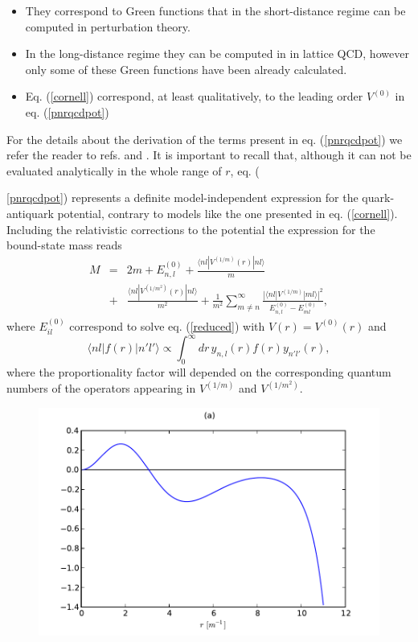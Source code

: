 \documentclass[10pt, a4paper, twocolumn]{article}
\begin{document}
\begin{itemize}
	\item They correspond to Green functions that in the short-distance regime can be computed in perturbation theory.
	\item In the long-distance regime they can be computed in in lattice QCD, however only some of these Green functions have been already calculated.
	\item Eq. (\ref{cornell}) correspond, at least qualitatively, to the leading order $V^{(0)}$ in eq. (\ref{pnrqcdpot})
\end{itemize} For the details about the derivation of the terms present in eq. (\ref{pnrqcdpot}) we refer the reader to refs. \cite{Brambilla:2000gk} and \cite{Pineda:2000sz}. It is important to recall that, although it can not be evaluated analytically in the whole range of $r$, eq. ({\ref{pnrqcdpot}) represents a definite model-independent expression for the quark-antiquark potential, contrary to models like the one presented in eq. (\ref{cornell}).\\
Including the relativistic corrections to the potential the expression for the bound-state mass reads
\begin{eqnarray}\label{mass}
    M&=&2m+E_{n,l}^{(0)}+\frac{\langle nl| V^{(1/m)}(r)|nl \rangle}{m}\\ \nonumber
    &+&\frac{\langle nl| V^{(1/m^2)}(r)|nl \rangle}{m^2}+\frac{1}{m^2}\sum_{m\neq n}^{\infty}\frac{|\langle nl|V^{(1/m)} | ml \rangle|^2}{E_{n,l}^{(0)}-E_{ml}^{(0)}},
\end{eqnarray} where $E_{il}^{(0)}$ correspond to solve eq. (\ref{reduced}) with $V(r)=V^{(0)}(r)$ and
\begin{equation}
    \langle nl | f(r) | n'l' \rangle  \propto  \int_0^\infty dr\, y_{n,l}(r)f(r)y_{n'l'}(r),
\end{equation} where the proportionality factor will depended on the corresponding quantum numbers of the operators appearing in $V^{(1/m)}$ and $V^{(1/m^2)}$. 
\begin{figure}[htb]
    \centering
\noindent\begin{minipage}[b]{.9\linewidth}
\includegraphics[width=\textwidth]{wfa.pdf}

\end{minipage}
\end{figure}}
\end{document}
